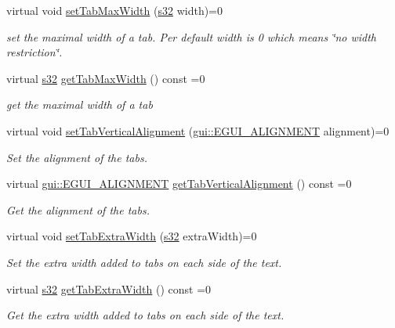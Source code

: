 \begin{DoxyCompactItemize}
virtual void \hyperlink{classirr_1_1gui_1_1IGUITabControl_a854b4d28fda5b9eb0ccc2f6a8c8e463c}{set\+Tab\+Max\+Width} (\hyperlink{namespaceirr_ac66849b7a6ed16e30ebede579f9b47c6}{s32} width)=0
\begin{DoxyCompactList}\small\item\em set the maximal width of a tab. Per default width is 0 which means \char`\"{}no width restriction\char`\"{}. \end{DoxyCompactList}\item 
\mbox{\label{classirr_1_1gui_1_1IGUITabControl_a6f5c5210417d07c3f87ce2db91341f3c}} 
virtual \hyperlink{namespaceirr_ac66849b7a6ed16e30ebede579f9b47c6}{s32} \hyperlink{classirr_1_1gui_1_1IGUITabControl_a6f5c5210417d07c3f87ce2db91341f3c}{get\+Tab\+Max\+Width} () const =0
\begin{DoxyCompactList}\small\item\em get the maximal width of a tab \end{DoxyCompactList}\item 
virtual void \hyperlink{classirr_1_1gui_1_1IGUITabControl_a5481d1c15605d00654c12581842ad311}{set\+Tab\+Vertical\+Alignment} (\hyperlink{namespaceirr_1_1gui_a19eb5fb40e67f108cb16aba922ddaa2d}{gui\+::\+E\+G\+U\+I\+\_\+\+A\+L\+I\+G\+N\+M\+E\+NT} alignment)=0
\begin{DoxyCompactList}\small\item\em Set the alignment of the tabs. \end{DoxyCompactList}\item 
virtual \hyperlink{namespaceirr_1_1gui_a19eb5fb40e67f108cb16aba922ddaa2d}{gui\+::\+E\+G\+U\+I\+\_\+\+A\+L\+I\+G\+N\+M\+E\+NT} \hyperlink{classirr_1_1gui_1_1IGUITabControl_a3153a7dba26548eda6a8013e1e669c18}{get\+Tab\+Vertical\+Alignment} () const =0
\begin{DoxyCompactList}\small\item\em Get the alignment of the tabs. \end{DoxyCompactList}\item 
\mbox{\label{classirr_1_1gui_1_1IGUITabControl_ab73b93ca48aabf376c4b10cf42db35d7}} 
virtual void \hyperlink{classirr_1_1gui_1_1IGUITabControl_ab73b93ca48aabf376c4b10cf42db35d7}{set\+Tab\+Extra\+Width} (\hyperlink{namespaceirr_ac66849b7a6ed16e30ebede579f9b47c6}{s32} extra\+Width)=0
\begin{DoxyCompactList}\small\item\em Set the extra width added to tabs on each side of the text. \end{DoxyCompactList}\item 
virtual \hyperlink{namespaceirr_ac66849b7a6ed16e30ebede579f9b47c6}{s32} \hyperlink{classirr_1_1gui_1_1IGUITabControl_afaeab7a998a34ab5e8398930276ab3bd}{get\+Tab\+Extra\+Width} () const =0
\begin{DoxyCompactList}\small\item\em Get the extra width added to tabs on each side of the text. \end{DoxyCompactList}\end{DoxyCompactItemize}
